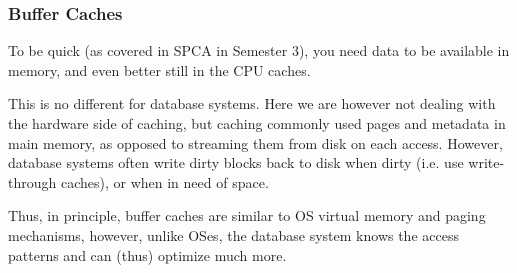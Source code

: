 \subsubsection{Buffer Caches}
To be quick (as covered in SPCA in Semester 3), you need data to be available in memory, and even better still in the CPU caches.

This is no different for database systems.
Here we are however not dealing with the hardware side of caching, but caching commonly used pages and metadata in main memory,
as opposed to streaming them from disk on each access. However, database systems often write dirty blocks back to disk when dirty (i.e. use write-through caches),
or when in need of space.

Thus, in principle, buffer caches are similar to OS virtual memory and paging mechanisms, however, unlike OSes,
the database system knows the access patterns and can (thus) optimize much more.
